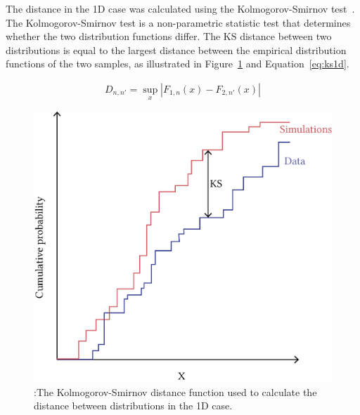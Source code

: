 The distance in the 1D case was calculated using the Kolmogorov-Smirnov test~\autocite{Kolmogorov:1933}. The Kolmogorov-Smirnov test is a non-parametric statistic test that determines whether the two distribution functions differ. The KS distance between two distributions is equal to the largest distance between the empirical distribution functions of the two samples, as illustrated in Figure~\ref{fig:ks-dist} and Equation~\ref{eq:ks1d}.

\begin{align}
\label{eq:ks1d}
D_{n,n'}=\sup _{x}|F_{1,n}(x)-F_{2,n'}(x)|
\end{align}



\begin{figure}[htbp]
\begin{center}
	\includegraphics[scale=0.5]{../../chapters/chapterABCFlow/images/ks-1d-overv.png}
			\caption[LoF caption]{\label{fig:ks-dist}:The Kolmogorov-Smirnov distance function used to calculate the distance between distributions in the 1D case.}
	\end{center}
\end{figure}




